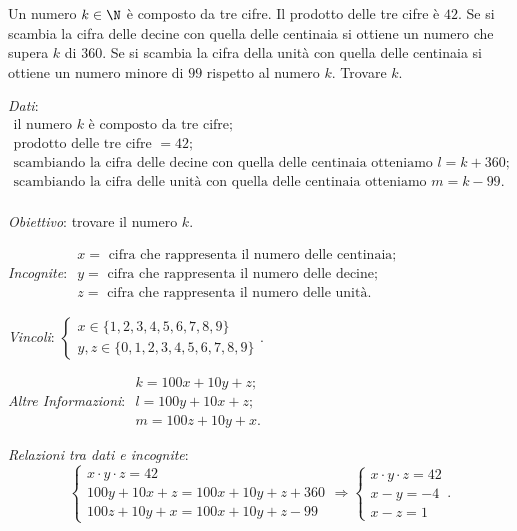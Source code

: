 \begin{problema}
Un numero \(k\in \N\) è composto da tre cifre. Il prodotto delle tre cifre è 
\(42\). Se si scambia la cifra delle decine con quella delle centinaia si 
ottiene un numero che supera \(k\) di \(360\). Se si scambia la cifra della 
unità con quella delle centinaia si ottiene un numero minore di \(99\) 
rispetto al numero \(k\). Trovare \(k\).
\end{problema}

\emph{Dati}: \(\begin{array}{l}
\text{il numero } k \text{ è composto da tre cifre};\\
\text{prodotto delle tre cifre } = 42;\\
\text{scambiando la cifra delle decine con quella delle centinaia otteniamo }l=k+360; \\
\text{scambiando la cifra delle unità con quella delle centinaia otteniamo } m=k-99.\\
\end{array}\)

\emph{Obiettivo}: trovare il numero \(k\).

\emph{Incognite}: \(\begin{array}{l}
x =\text{ cifra che rappresenta il numero delle centinaia;}\\
y=\text{ cifra che rappresenta il numero delle decine;}\\
z=\text{ cifra che rappresenta il numero delle unità.}
\end{array}\)

\emph{Vincoli}: \(\left\{\begin{array}{l}x\in \{1,2,3,4,5,6,7,8,9\} \\y,z\in \{0,1,2,3,4,5,6,7,8,9\}\end{array}\right.\).

\emph{Altre Informazioni}: \(\begin{array}{l}
k=100x+10y+z;\\
l=100y+10x+z;\\
m=100z+10y+x.
\end{array}\)

\emph{Relazioni tra dati e incognite}: \[ \left\{\begin{array}{l}x\cdot y\cdot z=42 \\100y+10x+z=100x+10y+z+360\\100z+10y+x=100x+10y+z-99 \end{array}\right.\Rightarrow \left\{\begin{array}{l}x\cdot y\cdot z=42 \\x-y=-4\\x-z=1\end{array}\right.. \]

